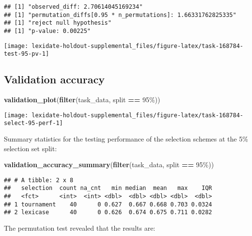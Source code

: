 \documentclass[
]{book}
\newenvironment{Shaded}{\begin{snugshade}}{\end{snugshade}}
\newcommand{\FunctionTok}[1]{\textcolor[rgb]{0.13,0.29,0.53}{\textbf{#1}}}
\newcommand{\NormalTok}[1]{#1}
\newcommand{\SpecialCharTok}[1]{\textcolor[rgb]{0.81,0.36,0.00}{\textbf{#1}}}
\newcommand{\StringTok}[1]{\textcolor[rgb]{0.31,0.60,0.02}{#1}}
\begin{document}
\begin{verbatim}
## [1] "observed_diff: 2.70614045169234"
## [1] "permutation_diffs[0.95 * n_permutations]: 1.66331762825335"
## [1] "reject null hypothesis"
## [1] "p-value: 0.00225"
\end{verbatim}

\texttt{[image: lexidate-holdout-supplemental\_files/figure-latex/task-168784-test-95-pv-1]}

\hypertarget{validation-accuracy-54}{%
\subsection{Validation accuracy}\label{validation-accuracy-54}}

\begin{Shaded}
\begin{Highlighting}[]
\FunctionTok{validation\_plot}\NormalTok{(}\FunctionTok{filter}\NormalTok{(task\_data, split }\SpecialCharTok{==} \StringTok{\textquotesingle{}95\%\textquotesingle{}}\NormalTok{))}
\end{Highlighting}
\end{Shaded}

\texttt{[image: lexidate-holdout-supplemental\_files/figure-latex/task-168784-select-95-perf-1]}

Summary statistics for the testing performance of the selection schemes at the 5\% selection set split:

\begin{Shaded}
\begin{Highlighting}[]
\FunctionTok{validation\_accuracy\_summary}\NormalTok{(}\FunctionTok{filter}\NormalTok{(task\_data, split }\SpecialCharTok{==} \StringTok{\textquotesingle{}95\%\textquotesingle{}}\NormalTok{))}
\end{Highlighting}
\end{Shaded}

\begin{verbatim}
## # A tibble: 2 x 8
##   selection  count na_cnt   min median  mean   max    IQR
##   <fct>      <int>  <int> <dbl>  <dbl> <dbl> <dbl>  <dbl>
## 1 tournament    40      0 0.627  0.667 0.668 0.703 0.0324
## 2 lexicase      40      0 0.626  0.674 0.675 0.711 0.0282
\end{verbatim}

The permutation test revealed that the results are:
\end{document}
